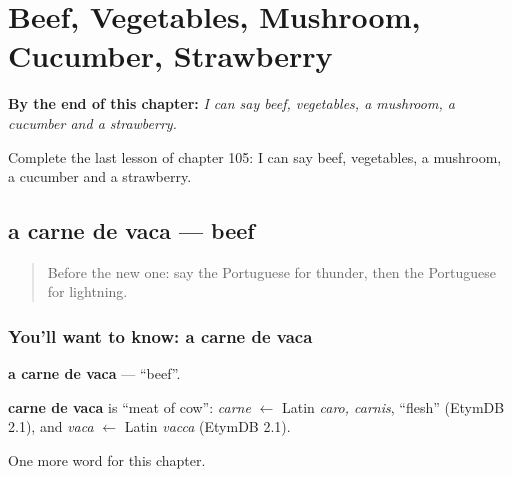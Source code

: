 
\chapter{Beef, Vegetables, Mushroom, Cucumber, Strawberry}
\label{ch:pt-beef-vegetables-mushroom-cucumber-strawberry}

\begin{chapteropening}
\textbf{By the end of this chapter:} \emph{I can say beef, vegetables, a mushroom, a cucumber and a strawberry.}

Complete the last lesson of chapter 105: I can say beef, vegetables, a mushroom, a cucumber and a strawberry.
\end{chapteropening}

\section[a carne de vaca]{a carne de vaca — beef}

\label{lesson:PT-C105-carne-de-vaca}



\begin{quote}
Before the new one: say the Portuguese for thunder, then the Portuguese for lightning.
\end{quote}

\subsection*{You'll want to know: a carne de vaca}
\textbf{a carne de vaca} — \textquotedblleft{}beef\textquotedblright{}.

\begin{cousinweb}
\textbf{carne de vaca} is \textquotedblleft{}meat of cow\textquotedblright{}: \emph{carne} $\leftarrow$ Latin \emph{caro, carnis}, \textquotedblleft{}flesh\textquotedblright{} (EtymDB 2.1), and \emph{vaca} $\leftarrow$ Latin \emph{vacca} (EtymDB 2.1).
\end{cousinweb}

\begin{grammarlens}[title={What you've built}]
One more word for this chapter.
\end{grammarlens}

